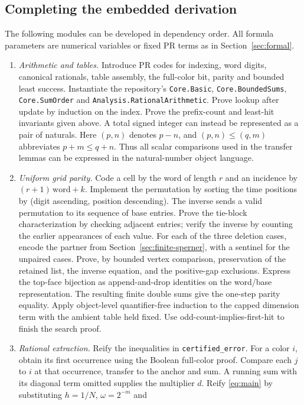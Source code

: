 \subsection{Completing the embedded derivation}
The following modules can be developed in dependency order. All formula
parameters are numerical variables or fixed PR terms as in
Section~\ref{sec:formal}.
\begin{enumerate}
\item \emph{Arithmetic and tables.} Introduce PR codes for indexing,
word digits, canonical rationals, table assembly, the full-color bit, parity
and bounded least success. Instantiate the repository's
\texttt{Core.Basic}, \texttt{Core.BoundedSums}, \texttt{Core.SumOrder} and
\texttt{Analysis.RationalArithmetic}. Prove lookup after update by induction
on the index. Prove the prefix-count and least-hit invariants given above.
A total signed integer can instead be represented as a pair of naturals. Here
$(p,n)$ denotes $p-n$, and $(p,n)\le(q,m)$ abbreviates $p+m\le q+n$.
Thus all scalar comparisons used in the transfer lemmas can be expressed in
the natural-number object language.
\item \emph{Uniform grid parity.} Code a cell by the word of length $r$
and an incidence by $(r+1)\,\mathrm{word}+k$. Implement the permutation
by sorting the time positions by (digit ascending, position descending).
The inverse sends a valid permutation to its sequence of base entries.
Prove the tie-block characterization by checking adjacent entries; verify
the inverse by counting the earlier appearances of each value. For each of
the three deletion cases, encode the partner from
Section~\ref{sec:finite-sperner}, with a sentinel for the unpaired cases.
Prove, by bounded vertex comparison, preservation of the retained list,
the inverse equation, and the positive-gap exclusions. Express the
top-face bijection as append-and-drop identities on the word/base
representation. The resulting finite double sums give the one-step
parity equality. Apply object-level quantifier-free induction to the
capped dimension term with the ambient table held fixed. Use
odd-count-implies-first-hit to finish the search proof.
\item \emph{Rational extraction.} Reify the inequalities in
\texttt{certified\_error}. For a color $i$, obtain its first occurrence
using the Boolean full-color proof. Compare each $j$ to $i$ at that
occurrence, transfer to the anchor and sum. A running sum with its
diagonal term omitted supplies the multiplier $d$. Reify
\eqref{eq:main} by substituting $h=1/N$, $\omega=2^{-m}$ and

\end{enumerate}
